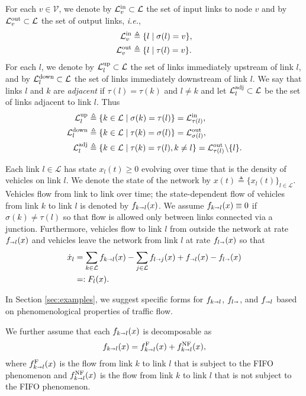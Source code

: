 \documentclass[letterpaper, 10 pt, conference]{ieeeconf}
\newcommand{\sra}{\shortrightarrow}
\newcommand{\Verts}{\mathcal{V}}
\newcommand{\Links}{\mathcal{L}}
\newcommand{\Lin}{\mathcal{L}^\textnormal{in}}
\newcommand{\Lout}{\mathcal{L}^\textnormal{out}}
\newcommand{\Lup}{\mathcal{L}^\textnormal{up}}
\newcommand{\Ldown}{\mathcal{L}^\textnormal{down}}
\newcommand{\Ladj}{\mathcal{L}^\textnormal{adj}}
\newcommand{\head}{{\sigma}}
\newcommand{\tail}{{\tau}}
\begin{document}
For each $v\in\Verts$, we denote by $\Lin_v\subset \Links$ the set of input links to node $v$ and by $\Lout_v\subset \Links$ the set of output links, \emph{i.e.},  
\begin{align}
  \label{eq:2}
\Lin_v&\triangleq\{l\mid\head(l)=v\},\\
\Lout_v&\triangleq\{l\mid\tail(l)=v\}.
\end{align}
For each $l$, we denote by $\Lup_l\subset\Links$ the set of links immediately upstream of link $l$, and by $\Ldown_l\subset \Links$ the set of links immediately downstream of link $l$. We say that links $l$ and $k$ are \emph{adjacent} if $\tail(l)=\tail(k)$ and $l\neq k$ and let $\Ladj_l\subset \Links$ be the set of links adjacent to link $l$. Thus
\begin{align}
  \label{eq:46}
\Lup_l&\triangleq\{k\in\Links\mid \head(k)=\tail(l)\} = \Lin_{\tail(l)},\\
\Ldown_l&\triangleq\{k\in\Links\mid \tail(k)=\head(l)\}= \Lout_{\head(l)},\\
\Ladj_l&\triangleq\{k\in\Links\mid \tail(k)=\tail(l), k\neq l\} = \Lout_{\tail(l)}\backslash\{l\}.
\end{align}




Each link $l\in\Links$ has state $x_l(t)\geq 0$ evolving over time that is the density of vehicles on link $l$. We denote the  state of the network by $x(t)\triangleq \{x_l(t)\}_{l\in\Links}$. Vehicles flow from link to link over time; the state-dependent flow of vehicles from link $k$ to link $l$ is denoted by $f_{k\sra l}(x)$. We assume $f_{k\sra l}(x)\equiv 0$ if $\head(k)\neq \tail(l)$ so that flow is allowed only between links connected via a junction.  Furthermore, vehicles flow to link $l$ from outside the network at rate $ f_{\sra l}(x)$ and vehicles leave the network from link $l$ at rate $f_{l\sra}(x)$ so that
\begin{align}
  \label{eq:42}
  \dot{x}_l&=\sum_{k\in\Links} f_{k\sra l}(x)-\sum_{j\in\Links}f_{l\sra j}(x) +f_{\sra l}(x) - f_{l\sra }(x)\\
  \label{eq:42-2}&=:F_l(x).
\end{align}

In Section \ref{sec:examples}, we suggest specific forms for $f_{k\sra l}$, $f_{l \sra}$, and $f_{\sra l}$ based on phenomenological properties of traffic flow. 

\newcommand{\fF}{f^\textnormal{F}}
\newcommand{\fNF}{f^\textnormal{NF}}

We further assume that each $f_{k\sra l}(x)$ is decomposable as
\begin{align}
  \label{eq:43}
  f_{k\sra l}(x) =   \fF_{k\sra l}(x)+ \fNF_{k\sra l}(x),
\end{align}
where $\fF_{k\sra l}(x)$ is the flow from link $k$ to link $l$ that is subject to the FIFO phenomenon and $\fNF_{k\sra l}(x)$ is the flow from link $k$ to link $l$ that is not subject to the FIFO phenomenon.
\end{document}
